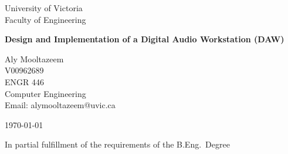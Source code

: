 \begin{titlepage}
    \centering
    \vspace*{2cm}
    {\large University of Victoria \\ Faculty of Engineering \par}
    \vspace{3cm}
    {\Large \bfseries Design and Implementation of a
    Digital Audio Workstation (DAW) \par}
    \vspace{3cm}
    {\large
        Aly Mooltazeem \\
        V00962689 \\
        ENGR 446 \\
        Computer Engineering \\
        Email: alymooltazeem@uvic.ca \\
    }
    \vspace{2cm}
    {\large \today \par}
    \vfill
    {\large In partial fulfillment of the requirements of the B.Eng.\ Degree \par}
\end{titlepage}
